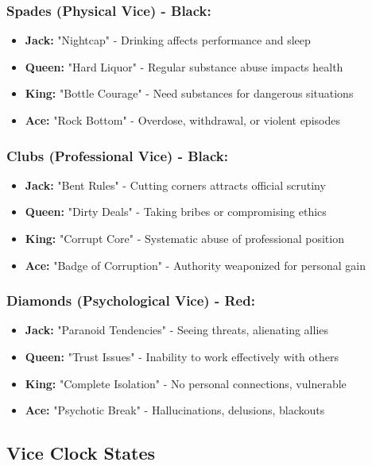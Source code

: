 \documentclass[11pt]{article}
\begin{document}
\subsubsection{Spades (Physical Vice) - Black:}
\begin{itemize}
    \item \textbf{Jack:} "Nightcap" - Drinking affects performance and sleep
    \item \textbf{Queen:} "Hard Liquor" - Regular substance abuse impacts health
    \item \textbf{King:} "Bottle Courage" - Need substances for dangerous situations
    \item \textbf{Ace:} "Rock Bottom" - Overdose, withdrawal, or violent episodes
\end{itemize}

\subsubsection{Clubs (Professional Vice) - Black:}
\begin{itemize}
    \item \textbf{Jack:} "Bent Rules" - Cutting corners attracts official scrutiny
    \item \textbf{Queen:} "Dirty Deals" - Taking bribes or compromising ethics
    \item \textbf{King:} "Corrupt Core" - Systematic abuse of professional position
    \item \textbf{Ace:} "Badge of Corruption" - Authority weaponized for personal gain
\end{itemize}

\subsubsection{Diamonds (Psychological Vice) - Red:}
\begin{itemize}
    \item \textbf{Jack:} "Paranoid Tendencies" - Seeing threats, alienating allies
    \item \textbf{Queen:} "Trust Issues" - Inability to work effectively with others
    \item \textbf{King:} "Complete Isolation" - No personal connections, vulnerable
    \item \textbf{Ace:} "Psychotic Break" - Hallucinations, delusions, blackouts
\end{itemize}

\subsection{Vice Clock States}
\end{document}
